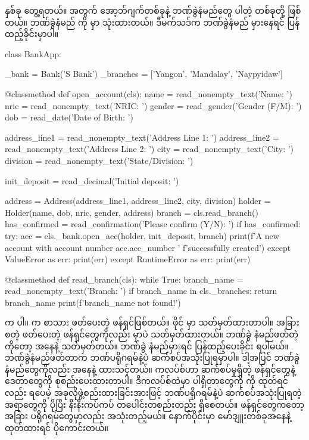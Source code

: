  နှစ်ခု တွေ့ရတယ်။  အတွက်  အော့ဘ်ဂျက်တစ်ခုနဲ့ ဘဏ်ခွဲနံမည်တွေ ပါတဲ့  တစ်ခုတို့ ဖြစ်တယ်။ ဘဏ်ခွဲနံမည်  ကို  မှာ သုံးထားတယ်။ ဒီမက်သဒ်က ဘဏ်ခွဲနံမည် မှားနေရင် ပြန်ထည့်ခိုင်းမှာပါ။
%
\begin{py}
class BankApp:

    _bank = Bank('S Bank')
    _branches = ['Yangon', 'Mandalay', 'Naypyidaw']

    @classmethod
    def open_account(cls):
        name = read_nonempty_text('Name: ')
        nric = read_nonempty_text('NRIC: ')
        gender = read_gender('Gender (F/M): ')
        dob = read_date('Date of Birth: ')

        address_line1 = read_nonempty_text('Address Line 1: ')
        address_line2 = read_nonempty_text('Address Line 2: ')
        city = read_nonempty_text('City: ')
        division = read_nonempty_text('State/Division: ')

        init_deposit = read_decimal('Initial deposit: ')

        address = Address(address_line1, address_line2, city, division)
        holder = Holder(name, dob, nric, gender, address)
        branch = cls.read_branch()
        has_confirmed = read_confirmation('Please confirm (Y/N): ')
        if has_confirmed:
            try:
                acc = cls._bank.open_acc(holder, init_deposit, branch)
                print(f'A new account with account number {acc.acc_number} '
                      f'successfully created')
            except ValueError as err:
                print(err)
            except RuntimeError as err:
                print(err)

    @classmethod
    def read_branch(cls):
        while True:
            branch_name = read_nonempty_text('Branch: ')
            if branch_name in cls._branches:
                return branch_name
            print(f'{branch_name} not found!')

\end{py}
%
 က  ပါ။  က စာသား  ဖတ်ပေးတဲ့ ဖန်ရှင်ဖြစ်တယ်။  ဖိုင်  မှာ သတ်မှတ်ထားတာပါ။ အခြား \fEn{,}  စတဲ့  ဖတ်ပေးတဲ့ ဖန်ရှင်တွေကိုလည်း  မှာပဲ သတ်မှတ်ထားတယ်။ ဘဏ်ခွဲ နံမည်ဖတ်တဲ့  ကိုတော့   အနေနဲ့ သတ်မှတ်တယ်။ ဘဏ်ခွဲ
နံမည်မှားရင် ပြန်ထည့်ပေးခိုင်း ရပါမယ်။ ဘဏ်ခွဲနံမည်ဖတ်တာက ဘဏ်ပရိုဂရမ်နဲ့ပဲ ဆက်စပ်အသုံးပြုရမှာပါ။ ဒါ့အပြင် ဘဏ်ခွဲနံမည်တွေကိုလည်း   အနေနဲ့ ထားသင့်တယ်။   ကလပ်စ်ဟာ ဆက်စပ်မှုရှိတဲ့ ဖန်ရှင်တွေနဲ့ ဒေတာတွေကို စုစည်းပေးထားတာပါ။ ဒီကလပ်စ်ထဲမှာ ပါရှိတာတွေကို  ကို ထုတ်ရင်လည်း ရပေမဲ့ အခုလိုဖွဲ့စည်းထားခြင်းအားဖြင့် ဘဏ်ပရိုဂရမ်နဲ့ပဲ ဆက်စပ်အသုံးပြုရတဲ့ အရာတွေကို ပိုပြီး နီးနီးကပ်ကပ် တပေါင်းတစည်းတည်း ရှိစေတယ်။  ဖန်ရှင်တွေကတော့ အခြား ပရိုဂရမ်တွေမှာလည်း အသုံးတည့်မယ်။ နောက်ပိုင်းမှာ မော်ဒျူးတစ်ခုအနေနဲ့ ထုတ်ထားရင် ပိုကောင်းတယ်။

